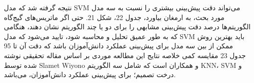 \documentclass{CSICC2020}
\begin{document}
نتیجه گرفته شد که مدل SVM می‌تواند دقت پیش‌بینی بیشتری را نسبت به سه مدل مورد بحث، به ارمغان بیاورد، جدول 22، شکل 21. حتی اگر ماتریس‌های گیج‌گاه الگوریتم‌ها درصد دقت پیش‌بینی مشابهی را برای دو یا چند الگوریتم نشان دهند، هنگامی که به طور عمیق تحلیل و محاسبه شود، تایید می‌شود که مدل SVM باید بهترین روش ممکن از بین سه مدل برای پیش‌بینی عملکرد دانش‌آموزان باشد که دقت آن تا 95%
جدول 23 مقایسه کمی خلاصه نتایج این مطالعه موردی بر اساس مقاله تحقیقی نوشته شده توسط Slamet Wiyono و همکاران است که شامل سه الگوریتم KNN، SVM و درخت تصمیم؛ برای پیش‌بینی عملکرد دانش‌آموزان، می‌باشد. 
\end{document}
